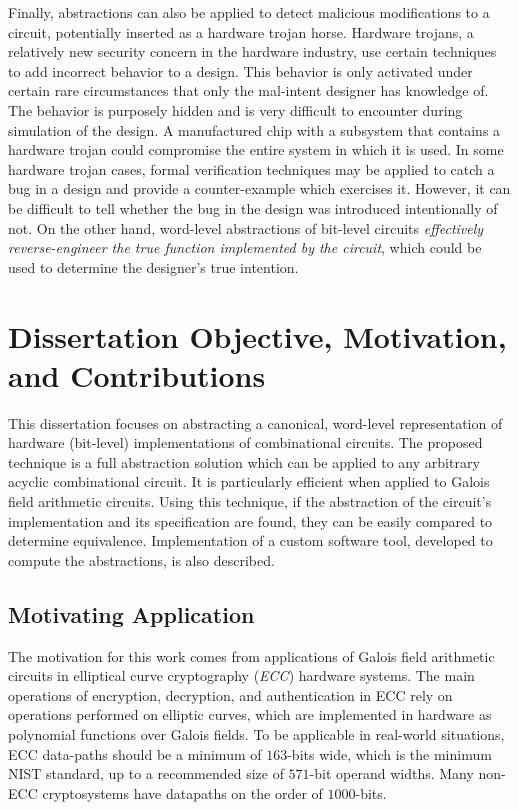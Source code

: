 Finally, abstractions can also be applied to detect malicious 
modifications to a circuit, potentially inserted as a hardware trojan horse.
Hardware trojans, a relatively new security concern in the hardware 
industry, use certain techniques to add incorrect behavior to a 
design. 
This behavior is only activated under certain rare circumstances that only 
the mal-intent designer has knowledge of.
The behavior is purposely hidden and is very difficult to encounter during 
simulation of the design. A manufactured chip with a subsystem 
that contains a hardware trojan could compromise the entire system in which 
it is used.
In some hardware trojan cases, formal verification techniques may be applied 
to catch a bug in a design and provide a counter-example which exercises it. 
However, it can be difficult to tell whether the bug in the design was 
introduced intentionally of not. On the other hand, word-level abstractions 
of bit-level circuits {\it effectively reverse-engineer the true function 
implemented by the circuit}, which could be used to determine the designer's 
true intention.

\section{Dissertation Objective, Motivation, and Contributions}
This dissertation focuses on abstracting a canonical, 
word-level representation of hardware (bit-level) implementations of 
combinational circuits. The proposed technique is a full abstraction solution which can be 
applied to any arbitrary acyclic combinational circuit. 
It is particularly efficient when applied to Galois field arithmetic circuits.
Using this technique, if the abstraction of the circuit's implementation and its
specification are found, they can be easily compared to determine equivalence.
Implementation of a custom software tool, developed to compute the abstractions, is
also described.

\subsection{Motivating Application}
The motivation for this work comes from applications of Galois field 
arithmetic circuits in elliptical curve cryptography ({\it ECC}) hardware systems.
The main operations of encryption, decryption, and 
authentication in ECC rely on operations performed on elliptic curves, which 
are implemented in hardware as polynomial functions over Galois fields. 
To be applicable in real-world situations, ECC data-paths
should be a minimum of $163$-bits wide, which is the minimum NIST standard, 
up to a recommended size of $571$-bit operand widths. Many non-ECC cryptosystems
have datapaths on the order of $1000$-bits.

